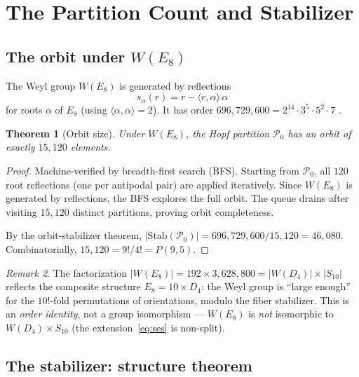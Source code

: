 \documentclass[11pt,reqno]{amsart}
\theoremstyle{plain}
\newtheorem{theorem}{Theorem}[section]
\theoremstyle{definition}
\theoremstyle{remark}
\newtheorem{remark}[theorem]{Remark}
\newcommand{\Stab}{\mathrm{Stab}}
\begin{document}
\section{The Partition Count and Stabilizer}
\label{sec:stabilizer}

\subsection{The orbit under $W(E_8)$}

The Weyl group $W(E_8)$ is generated by reflections
\begin{equation}\label{eq:reflection}
  s_\alpha(r) = r - \langle r,\alpha\rangle\,\alpha
\end{equation}
for roots $\alpha$ of $E_8$ (using
$\langle\alpha,\alpha\rangle = 2$).
It has order $696{,}729{,}600 = 2^{14}\cdot 3^5\cdot 5^2\cdot 7$
\cite{Humphreys1990}.

\begin{theorem}[Orbit size]\label{thm:orbit}
Under $W(E_8)$, the Hopf partition $\mathcal{P}_0$ has an
orbit of exactly $15{,}120$ elements.
\end{theorem}

\begin{proof}
Machine-verified by breadth-first search (BFS).
Starting from $\mathcal{P}_0$, all $120$ root reflections
(one per antipodal pair) are applied iteratively.
Since $W(E_8)$ is generated by reflections, the BFS explores
the full orbit.
The queue drains after visiting $15{,}120$ distinct
partitions, proving orbit completeness.

By the orbit-stabilizer theorem,
$|\Stab(\mathcal{P}_0)| = 696{,}729{,}600 / 15{,}120
= 46{,}080$.
Combinatorially,
$15{,}120 = 9!/4! = P(9,5)$.
\end{proof}

\begin{remark}\label{rem:orderidentity}
The factorization
$|W(E_8)| = 192 \times 3{,}628{,}800 = |W(D_4)| \times |S_{10}|$
reflects the composite structure $E_8 = 10 \times D_4$:
the Weyl group is ``large enough'' for the $10!$-fold
permutations of orientations, modulo the fiber stabilizer.
This is an \emph{order identity}, not a group isomorphism ---
$W(E_8)$ is \emph{not} isomorphic to $W(D_4) \times S_{10}$
(the extension~\eqref{eq:ses} is non-split).
\end{remark}

\subsection{The stabilizer: structure theorem}
\end{document}
